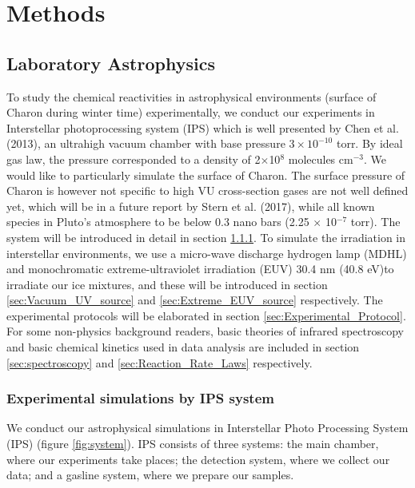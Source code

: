 \chapter{\protect Methods}
\label{methods}

\section{Laboratory Astrophysics}
To study the chemical reactivities in astrophysical environments (surface of Charon during winter time) experimentally,
we conduct our experiments in Interstellar photoprocessing system (IPS) which is well presented by Chen et al. (2013)\cite{chen2013vacuum},
an ultrahigh vacuum chamber with base pressure $3 \times 10^{-10}$ torr. By ideal gas law, the pressure corresponded to a density of 2$\times$10$^8$ molecules cm$^{-3}$. We would like to particularly simulate the surface of Charon. The surface pressure of Charon is however not specific to high VU cross-section gases are not well defined yet, which will be in a future report by Stern et al. (2017)\cite{stern2017new}, while all known species in Pluto's atmosphere to be below 0.3 nano bars (2.25 $\times$ 10$^{-7}$ torr).
The system will be introduced in detail in section \ref{sec:IPS_system}.
To simulate the irradiation in interstellar environments,
we use a micro-wave discharge hydrogen lamp (MDHL) and monochromatic extreme-ultraviolet irradiation (EUV) 30.4 nm (40.8 eV)to irradiate our ice mixtures,
and these will be introduced in section \ref{sec:Vacuum_UV_source} and \ref{sec:Extreme_EUV_source} respectively.
The experimental protocols will be elaborated in section \ref{sec:Experimental_Protocol}.
For some non-physics background readers, basic theories of infrared spectroscopy and basic chemical kinetics used in data analysis are included in section \ref{sec:spectroscopy} and \ref{sec:Reaction_Rate_Laws} respectively.\\

\subsection{Experimental simulations by IPS system}
\label{sec:IPS_system}

We conduct our astrophysical simulations in Interstellar Photo Processing System (IPS) (figure \ref{fig:system}). IPS consists of three systems: the main chamber, where our experiments take places; the detection system, where we collect our data; and a gasline system, where we prepare our samples.

